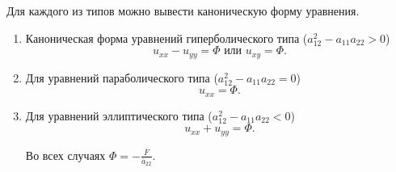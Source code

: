 Для каждого из типов можно вывести каноническую форму уравнения.
\begin{enumerate}
	\item Каноническая форма уравнений гиперболического типа ($a_{12}^2 - a_{11} a_{22} > 0$) \begin{equation}
		u_{xx} - u_{yy} = \Phi \text{ или } u_{xy} = \Phi.
	\end{equation}
	
	\item Для уравнений параболического типа ($a_{12}^2 - a_{11} a_{22} = 0$)
	\begin{equation}
		u_{xx} = \Phi.
	\end{equation}
	
	\item Для уравнений эллиптического типа ($a_{12}^2 - a_{11} a_{22} < 0$)
	\begin{equation}
		u_{xx} + u_{yy} = \Phi.
	\end{equation} 
	
	Во всех случаях $\Phi = -\frac{\bar{F}}{\bar{a}_{22}}$.
\end{enumerate}
